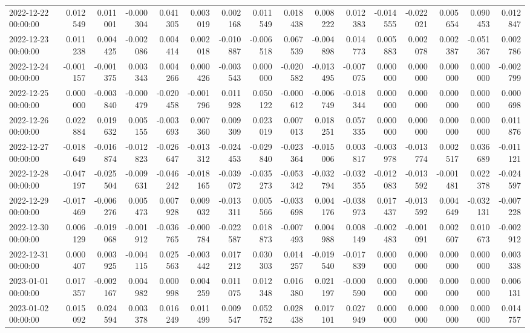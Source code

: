 \begin{tabular}{lrrrrrrrrrrrrrrr}
2022-12-22 00:00:00 & 0.012549 & 0.011001 & -0.000304 & 0.041305 & 0.003019 & 0.002168 & 0.011549 & 0.018438 & 0.008222 & 0.012383 & -0.014555 & -0.022021 & 0.005654 & 0.090453 & 0.012847 \\
2022-12-23 00:00:00 & 0.011238 & 0.004425 & -0.002086 & 0.004414 & 0.002018 & -0.010887 & -0.006518 & 0.067539 & -0.004898 & 0.014773 & 0.005883 & 0.002078 & 0.002387 & -0.051367 & 0.002786 \\
2022-12-24 00:00:00 & -0.001157 & -0.001375 & 0.003343 & 0.004266 & 0.000426 & -0.003543 & 0.000000 & -0.020582 & -0.013495 & -0.007075 & 0.000000 & 0.000000 & 0.000000 & 0.000000 & -0.002799 \\
2022-12-25 00:00:00 & 0.000000 & -0.003840 & -0.000479 & -0.020458 & -0.001796 & 0.011928 & 0.050122 & -0.000612 & -0.006749 & -0.018344 & 0.000000 & 0.000000 & 0.000000 & 0.000000 & 0.000698 \\
2022-12-26 00:00:00 & 0.022884 & 0.019632 & 0.005155 & -0.003693 & 0.007360 & 0.009309 & 0.023019 & 0.007013 & 0.018251 & 0.057335 & 0.000000 & 0.000000 & 0.000000 & 0.000000 & 0.011876 \\
2022-12-27 00:00:00 & -0.018649 & -0.016874 & -0.012823 & -0.026647 & -0.013312 & -0.024453 & -0.029840 & -0.023364 & -0.015006 & 0.003817 & -0.003978 & -0.013774 & 0.002517 & 0.036689 & -0.011121 \\
2022-12-28 00:00:00 & -0.047197 & -0.025504 & -0.009631 & -0.046242 & -0.018165 & -0.039072 & -0.035273 & -0.053342 & -0.032794 & -0.032355 & -0.012083 & -0.013592 & -0.001481 & 0.022378 & -0.024597 \\
2022-12-29 00:00:00 & -0.017469 & -0.006276 & 0.005473 & 0.007928 & 0.009032 & -0.013311 & 0.005566 & -0.033698 & 0.004176 & -0.038973 & 0.017437 & -0.013592 & 0.004649 & -0.032131 & -0.007228 \\
2022-12-30 00:00:00 & 0.006129 & -0.019068 & -0.001912 & -0.036765 & -0.000784 & -0.022587 & 0.018873 & -0.007493 & 0.004988 & 0.008149 & -0.002483 & -0.001091 & 0.002607 & 0.010673 & -0.002912 \\
2022-12-31 00:00:00 & 0.000407 & 0.003925 & -0.004115 & 0.025563 & -0.003442 & 0.017212 & 0.030303 & 0.014257 & -0.019540 & -0.017839 & 0.000000 & 0.000000 & 0.000000 & 0.000000 & 0.003338 \\
2023-01-01 00:00:00 & 0.017357 & -0.002167 & 0.004982 & 0.000998 & 0.004259 & 0.011075 & 0.012348 & 0.016380 & 0.021197 & -0.000590 & 0.000000 & 0.000000 & 0.000000 & 0.000000 & 0.006131 \\
2023-01-02 00:00:00 & 0.015092 & 0.024594 & 0.003378 & 0.016249 & 0.011499 & 0.009547 & 0.052752 & 0.028438 & 0.017101 & 0.027949 & 0.000000 & 0.000000 & 0.000000 & 0.000000 & 0.014757 \\

\end{tabular}
